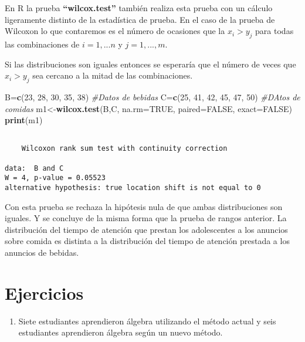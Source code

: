 \documentclass[
  a4paper,
  oneside,
  openany]{book}
\newenvironment{Shaded}{\begin{snugshade}}{\end{snugshade}}
\newcommand{\AttributeTok}[1]{\textcolor[rgb]{0.13,0.29,0.53}{#1}}
\newcommand{\CommentTok}[1]{\textcolor[rgb]{0.56,0.35,0.01}{\textit{#1}}}
\newcommand{\ConstantTok}[1]{\textcolor[rgb]{0.56,0.35,0.01}{#1}}
\newcommand{\DecValTok}[1]{\textcolor[rgb]{0.00,0.00,0.81}{#1}}
\newcommand{\FunctionTok}[1]{\textcolor[rgb]{0.13,0.29,0.53}{\textbf{#1}}}
\newcommand{\NormalTok}[1]{#1}
\newcommand{\OtherTok}[1]{\textcolor[rgb]{0.56,0.35,0.01}{#1}}
\providecommand{\tightlist}{%
  \setlength{\itemsep}{0pt}\setlength{\parskip}{0pt}}
\begin{document}
En R la prueba \textbf{``wilcox.test''} también realiza esta prueba con un cálculo ligeramente distinto de la estadística de prueba. En el caso de la prueba de Wilcoxon lo que contaremos es el número de ocasiones que la \(x_i>y_j\) para todas las combinaciones de \(i=1,...n\) y \(j=1,...,m\).

Si las distribuciones son iguales entonces se esperaría que el número de veces que \(x_i>y_j\) sea cercano a la mitad de las combinaciones.

\begin{Shaded}
\begin{Highlighting}[]
\NormalTok{B}\OtherTok{=}\FunctionTok{c}\NormalTok{(}\DecValTok{23}\NormalTok{, }\DecValTok{28}\NormalTok{, }\DecValTok{30}\NormalTok{, }\DecValTok{35}\NormalTok{, }\DecValTok{38}\NormalTok{)     }\CommentTok{\#Datos de bebidas}
\NormalTok{C}\OtherTok{=}\FunctionTok{c}\NormalTok{(}\DecValTok{25}\NormalTok{, }\DecValTok{41}\NormalTok{, }\DecValTok{42}\NormalTok{, }\DecValTok{45}\NormalTok{, }\DecValTok{47}\NormalTok{, }\DecValTok{50}\NormalTok{) }\CommentTok{\#DAtos de comidas}
\NormalTok{m1}\OtherTok{\textless{}{-}}\FunctionTok{wilcox.test}\NormalTok{(B,C, }\AttributeTok{na.rm=}\ConstantTok{TRUE}\NormalTok{, }\AttributeTok{paired=}\ConstantTok{FALSE}\NormalTok{, }\AttributeTok{exact=}\ConstantTok{FALSE}\NormalTok{)}
\FunctionTok{print}\NormalTok{(m1)}
\end{Highlighting}
\end{Shaded}

\begin{verbatim}

    Wilcoxon rank sum test with continuity correction

data:  B and C
W = 4, p-value = 0.05523
alternative hypothesis: true location shift is not equal to 0
\end{verbatim}

Con esta prueba se rechaza la hipótesis nula de que ambas distribuciones son iguales. Y se concluye de la misma forma que la prueba de rangos anterior. La distribución del tiempo de atención que prestan los adolescentes a los anuncios sobre comida es distinta a la distribución del tiempo de atención prestada a los anuncios de bebidas.

\hypertarget{ejercicios-5}{%
\section{Ejercicios}\label{ejercicios-5}}

\begin{enumerate}
\def\labelenumi{\arabic{enumi}.}
\tightlist
\item
  Siete estudiantes aprendieron álgebra utilizando el método actual y seis estudiantes aprendieron álgebra según un nuevo método.
\end{enumerate}
\end{document}
